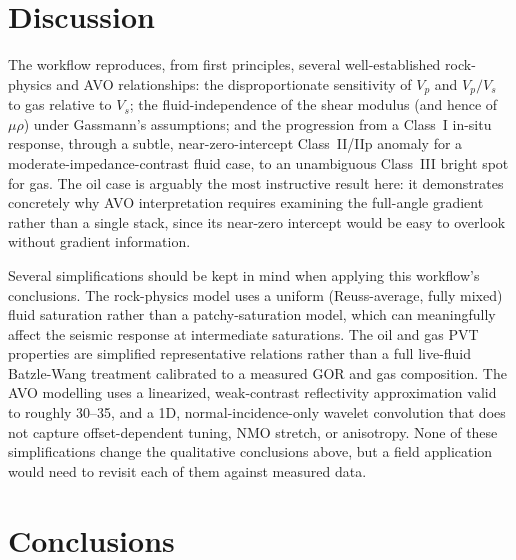 \documentclass[11pt]{article}
\begin{document}
\section{Discussion}

The workflow reproduces, from first principles, several well-established rock-physics and AVO relationships: the disproportionate sensitivity of \(V_p\) and \(V_p/V_s\) to gas relative to \(V_s\); the fluid-independence of the shear modulus (and hence of \(\mu\rho\)) under Gassmann's assumptions; and the progression from a Class~I in-situ response, through a subtle, near-zero-intercept Class~II/IIp anomaly for a moderate-impedance-contrast fluid case, to an unambiguous Class~III bright spot for gas. The oil case is arguably the most instructive result here: it demonstrates concretely why AVO interpretation requires examining the full-angle gradient rather than a single stack, since its near-zero intercept would be easy to overlook without gradient information.

Several simplifications should be kept in mind when applying this workflow's conclusions. The rock-physics model uses a uniform (Reuss-average, fully mixed) fluid saturation rather than a patchy-saturation model, which can meaningfully affect the seismic response at intermediate saturations. The oil and gas PVT properties are simplified representative relations rather than a full live-fluid Batzle-Wang treatment calibrated to a measured GOR and gas composition. The AVO modelling uses a linearized, weak-contrast reflectivity approximation valid to roughly 30--35\textdegree, and a 1D, normal-incidence-only wavelet convolution that does not capture offset-dependent tuning, NMO stretch, or anisotropy. None of these simplifications change the qualitative conclusions above, but a field application would need to revisit each of them against measured data.

\section{Conclusions}
\end{document}
